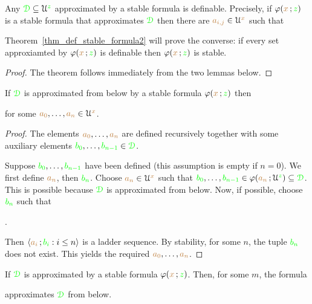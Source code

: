 \begin{theorem}\label{thm_def_stable_formula}
Any ${\color{green}\EuScript D}\subseteq\EuScript U^{\color{green} z}$ approximated by a stable formula is definable.
Precisely, if $\varphi({\color{brown} x}\,;{\color{green} z})$ is a stable formula that approximates ${\color{green}\EuScript D}$ then there are ${\color{brown} a_{i,j}}\in\EuScript U^{\color{brown} x}$ such that 

\end{theorem}

Theorem~\ref{thm_def_stable_formula2} will prove the converse: if every set approxiamted by $\varphi({\color{brown} x}\,;{\color{green} z})$ is definable then $\varphi({\color{brown} x}\,;{\color{green} z})$ is stable.

\begin{proof}
  The theorem follows immediately from the two lemmas below.
\end{proof}

\begin{lemma}
If ${\color{green}\EuScript D}$ is approximated from below by a stable formula $\varphi({\color{brown} x}\,;{\color{green} z})$ then


for some ${\color{brown} a_0},\dots,{\color{brown} a_n}\in\EuScript U^{\color{brown} x}$. 
\end{lemma}

\begin{proof}
The elements ${\color{brown} a_0},\dots,{\color{brown} a_n}$ are defined recursively together with some auxiliary elements ${\color{green} b_0},\dots,{\color{green} b_{n-1}}\in{\color{green}\EuScript D}$.

Suppose ${\color{green} b_0},\dots,{\color{green} b_{n-1}}$ have been defined (this assumption is empty if $n=0$).
We first define ${\color{brown} a_n}$, then ${\color{green} b_n}$. 
Choose ${\color{brown} a_n}\in\EuScript U^{\color{brown} x}$ such that ${\color{green} b_0},\dots,{\color{green} b_{n-1}}\in\varphi({\color{brown} a_n}\,;\EuScript U^{\color{green} z})\subseteq{\color{green}\EuScript D}$.
This is possible because ${\color{green}\EuScript D}$ is approximated from below.
Now, if possible, choose ${\color{green} b_n}$ such that

.

Then $\langle{\color{brown}a_i}\,;{\color{green} b_i} : i\le n\rangle$ is a ladder sequence. 
By stability, for some $n$, the tuple ${\color{green} b_n}$ does not exist.
This yields the required ${\color{brown} a_0},\dots,{\color{brown} a_n}$.
\end{proof}

\begin{lemma}\label{lem_stab_approx_below}
If ${\color{green}\EuScript D}$ is approximated by a stable formula $\varphi({\color{brown} x}\,;{\color{green} z})$.
Then, for some $m$, the formula 


approximates ${\color{green}\EuScript D}$ from below.
\end{lemma}

